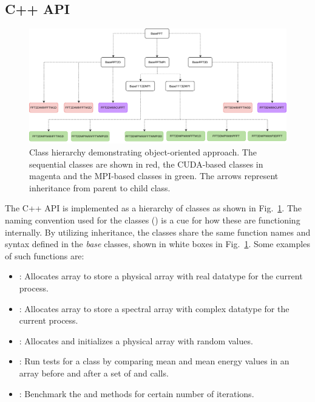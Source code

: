 \documentclass{../jors}
\begin{document}
\subsection*{C++ API}

\begin{figure}[htp]
  \centering
  \includegraphics[width=\linewidth]{Pyfig/fig_classes}
  \caption{Class hierarchy demonstrating object-oriented approach. The
    sequential classes are shown in red, the CUDA-based classes in magenta and
    the MPI-based classes in green. The arrows represent inheritance from
    parent to child class.
  }\label{fig:classes}
\end{figure}

The C++ API is implemented as a hierarchy of classes as shown in
Fig.~\ref{fig:classes}.
%
The naming convention used for the classes () is a cue for how these are functioning internally.
%
By utilizing inheritance, the classes share the same function names and syntax
defined in the \emph{base} classes, shown in white boxes in
Fig.~\ref{fig:classes}. Some examples of such functions are:

\begin{itemize}
  \item {}: Allocates array to store a physical array
    with real datatype for the current process.
  \item {}: Allocates array to store a spectral array
    with complex datatype  for the current process.
  \item {}: Allocates and initializes a physical
    array with random values.
  \item {}: Run tests for a class by comparing mean and mean energy
    values in an array before and after a set of  and
     calls.
  \item {}: Benchmark the  and
     methods for certain number of iterations.
\end{itemize}
\end{document}
